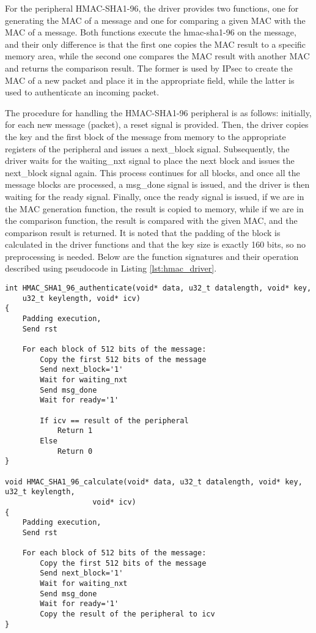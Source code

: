 For the peripheral HMAC-SHA1-96, the driver provides two functions, one for generating the MAC of a message and one for comparing a given MAC with the MAC of a message. Both functions execute the hmac-sha1-96 on the message, and their only difference is that the first one copies the MAC result to a specific memory area, while the second one compares the MAC result with another MAC and returns the comparison result. The former is used by IPsec to create the MAC of a new packet and place it in the appropriate field, while the latter is used to authenticate an incoming packet.

The procedure for handling the HMAC-SHA1-96 peripheral is as follows: initially, for each new message (packet), a reset signal is provided. Then, the driver copies the key and the first block of the message from memory to the appropriate registers of the peripheral and issues a next\_block signal. Subsequently, the driver waits for the waiting\_nxt signal to place the next block and issues the next\_block signal again. This process continues for all blocks, and once all the message blocks are processed, a msg\_done signal is issued, and the driver is then waiting for the ready signal. Finally, once the ready signal is issued, if we are in the MAC generation function, the result is copied to memory, while if we are in the comparison function, the result is compared with the given MAC, and the comparison result is returned. It is noted that the padding of the block is calculated in the driver functions and that the key size is exactly 160 bits, so no preprocessing is needed.
Below are the function signatures and their operation described using pseudocode in Listing \ref{lst:hmac_driver}.\\

\begin{lstlisting}[style=mycodestyle, label={lst:hmac_driver}, caption={HMAC driver pseudocode}]
int HMAC_SHA1_96_authenticate(void* data, u32_t datalength, void* key, 
    u32_t keylength, void* icv)
{
    Padding execution,
    Send rst
    
    For each block of 512 bits of the message:
        Copy the first 512 bits of the message
        Send next_block='1'
        Wait for waiting_nxt
        Send msg_done
        Wait for ready='1'

        If icv == result of the peripheral
            Return 1
        Else
            Return 0
}

void HMAC_SHA1_96_calculate(void* data, u32_t datalength, void* key, u32_t keylength, 
                    void* icv)
{
    Padding execution,
    Send rst
    
    For each block of 512 bits of the message:
        Copy the first 512 bits of the message
        Send next_block='1'
        Wait for waiting_nxt
        Send msg_done
        Wait for ready='1'
        Copy the result of the peripheral to icv
}

\end{lstlisting}